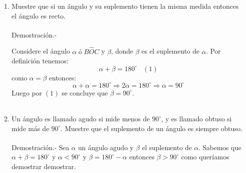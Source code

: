 \begin{enumerate}

	\item Muestre que si un ángulo y su suplemento tienen la misma medida entonces el ángulo es recto.\\\\
	    Demostración.-\;  
	    \begin{center}
	    \end{center}

	    Considere el ángulo $\alpha \; ó \; B \widehat{O} C$ y $\beta$, donde $\beta$ es el suplemento de $\alpha$. Por definición tenemos: $$ \alpha + \beta = 180^{\circ} \;\;\; (1)$$ como $\alpha = \beta$ entonces: $$\alpha + \alpha = 180^{\circ} \Rightarrow 2\alpha = 180^{\circ} \Rightarrow \alpha = 90^{\circ}$$ Luego por $(1)$ se concluye que $\beta = 90^{\circ}$.\\\\

	\item Un ángulo es llamado agudo si mide menos de $90^{\circ}$, y es llamado obtuso si mide más de $90^{\circ}$. Muestre que el suplemento de un ángulo es siempre obtuso.\\\\
	    Demostración.-\; Sea $\alpha$ un ángulo agudo y $\beta$  el suplemento de $\alpha$. Sabemos que $\alpha + \beta = 180^{\circ}$ y $\alpha < 90^{\circ}$ y $\beta = 180^{\circ} - \alpha$ entonces $\beta > 90^{\circ}$ como queríamos demostrar demostrar.\\\\


\end{enumerate}
